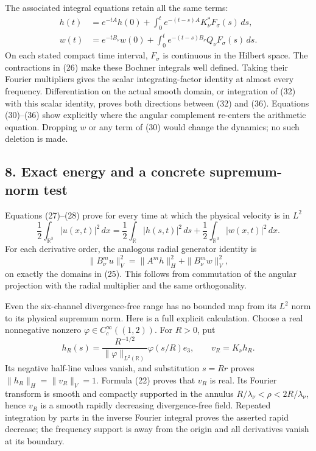 The associated integral equations retain all the same terms: \[
\begin{aligned}
h(t)&=e^{-tA}h(0)+\int_0^te^{-(t-s)A}K_\nu^*F_\sigma(s)\,ds,\\
w(t)&=e^{-tB_\nu}w(0)+\int_0^te^{-(t-s)B_\nu}Q_\nu F_\sigma(s)\,ds.
\end{aligned}
\tag{36}
\] On each stated compact time interval, \(F_\sigma\) is continuous in the Hilbert space. The contractions in (26) make these Bochner integrals well defined. Taking their Fourier multipliers gives the scalar integrating-factor identity at almost every frequency. Differentiation on the actual smooth domain, or integration of (32) with this scalar identity, proves both directions between (32) and (36). Equations (30)--(36) show explicitly where the angular complement re-enters the arithmetic equation. Dropping \(w\) or any term of (30) would change the dynamics; no such deletion is made.

\subsection*{8. Exact energy and a concrete supremum-norm test}

Equations (27)--(28) prove for every time at which the physical velocity is in \(L^2\) \[
\frac12\int_{\mathbb R^3}|u(x,t)|^2\,dx
=\frac12\int_{\mathbb R}|h(s,t)|^2\,ds
+\frac12\int_{\mathbb R^3}|w(x,t)|^2\,dx.
\tag{37}
\] For each derivative order, the analogous radial generator identity is \[
\|B_\nu^m u\|_V^2=\|A^mh\|_H^2+\|B_\nu^mw\|_V^2,
\tag{38}
\] on exactly the domains in (25). This follows from commutation of the angular projection with the radial multiplier and the same orthogonality.

Even the six-channel divergence-free range has no bounded map from its \(L^2\) norm to its physical supremum norm. Here is a full explicit calculation. Choose a real nonnegative nonzero \(\varphi\in C_c^\infty((1,2))\). For \(R>0\), put \[
h_R(s)=\frac{R^{-1/2}}{\|\varphi\|_{L^2(\mathbb R)}}\varphi(s/R)e_3,
\qquad v_R=K_\nu h_R.
\tag{39}
\] Its negative half-line values vanish, and substitution \(s=Rr\) proves \(\|h_R\|_H=\|v_R\|_V=1\). Formula (22) proves that \(v_R\) is real. Its Fourier transform is smooth and compactly supported in the annulus \(R/\lambda_\nu<\rho<2R/\lambda_\nu\), hence \(v_R\) is a smooth rapidly decreasing divergence-free field. Repeated integration by parts in the inverse Fourier integral proves the asserted rapid decrease; the frequency support is away from the origin and all derivatives vanish at its boundary.


